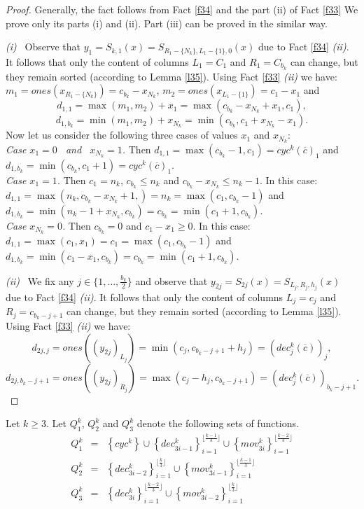 \documentclass{llncs}
\begin{document}
\begin{proof} Generally, the fact follows from Fact \ref{f34} and the
  part (ii) of Fact \ref{f33} We prove only its parts (i) and (ii). Part
  (iii) can be proved in the similar way.

\textit{(i)~} Observe that $y_1=S_{k,1}(x)=S_{R_1-\{N_k\},L_1-\{1\},0}(x)$
  due to Fact \ref{f34} \textit{(ii)}. It follows that only the content
  of columns $L_1=C_1$ and $R_1=C_{b_k}$ can change, but they remain
  sorted (according to Lemma \ref{l35}). Using Fact
  \ref{f33} \textit{(ii)} we have: $m_1 = ones(x_{R_1-\{N_k\}}) =
  c_{b_k}-x_{N_k}$, $m_2 = ones(x_{L_1-\{1\}}) = c_1-x_1$ and
$$d_{1,1} = \max(m_1,m_2)+x_1 = \max(c_{b_k}-x_{N_k}+x_1,c_1),$$
$$d_{1,b_k} = \min(m_1,m_2)+x_{N_k} = \min(c_{b_k},c_1+x_{N_k}-x_1).$$
Now let us consider the following three cases of values $x_1$ and
$x_{N_k}$: \\
\noindent
{\it Case $x_1=0$ ~and~ $x_{N_k}=1$.} Then 
  $d_{1,1} = \max(c_{b_k}-1,c_1) = cyc^k(\overline{c})_1$ and 
  $d_{1,b_k} = \min(c_{b_k},c_1+1)=cyc^k(\overline{c})_1$.\\
\noindent
{\it Case $x_1=1$.} Then $c_1=n_k$, $c_{b_k}\le n_k$ and
$c_{b_k}-x_{N_k}\le n_k-1$. In this case:
  $d_{1,1} = \max(n_k,c_{b_k}-x_{N_k}+1,) = n_k = \max(c_1,c_{b_k}-1)$ and 
  $d_{1,b_k} = \min(n_k-1+x_{N_k},c_{b_k}) = c_{b_k} = \min(c_1+1,c_{b_k})$.\\
\noindent
{\it Case $x_{N_k}=0$.} Then $c_{b_k}=0$ and $c_1-x_1\ge 0$. In this case:
  $d_{1,1} = \max(c_1,x_1) = c_1 = \max(c_1,c_{b_k}-1)$ and 
  $d_{1,b_k} = \min(c_1-x_1,c_{b_k}) = c_{b_k} = \min(c_1+1,c_{b_k})$.

\textit{(ii)~} We fix any $j\in\{1,\ldots,\frac{b_k}{2}\}$ and observe
  that $y_{2j}=S_{2j}(x)=S_{L_j,R_j,h_j}(x)$ due to Fact \ref{f34}
  \textit{(ii)}. It follows that only the content of columns $L_j=c_j$
  and $R_j=c_{b_k-j+1}$ can change, but they remain sorted (according to
  Lemma \ref{l35}). Using Fact \ref{f33} \textit{(ii)} we have:
$$d_{2j,j} = ones((y_{2j})_{L_j}) = \min(c_j,c_{b_k-j+1}+h_j) = 
  (dec^k_j(\overline{c}))_j,$$
$$d_{2j,b_k-j+1} = ones((y_{2j})_{R_j}) = \max(c_j-h_j,c_{b_k-j+1}) = 
  (dec^k_j(\overline{c}))_{b_k-j+1}.$$
\end{proof}
\begin{definition} \label{defQ}
Let $k\ge 3$. Let $Q^k_1$, $Q^k_2$ and $Q^k_3$ denote the following sets
of functions.
\begin{eqnarray}
Q^k_1 & = & \left\{cyc^k\right\} \cup 
          \left\{dec^k_{3i-1}\right\}_{i=1}^{\lfloor\frac{k-1}{3}\rfloor} \cup
          \left\{mov^k_{3i}\right\}_{i=1}^{\lfloor\frac{k-2}{3}\rfloor}\\
Q^k_2 & = & \left\{dec^k_{3i-2}\right\}_{i=1}^{\lfloor\frac{k}{3}\rfloor} \cup
          \left\{mov^k_{3i-1}\right\}_{i=1}^{\lfloor\frac{k-1}{3}\rfloor}\\
Q^k_3 & = & \left\{dec^k_{3i}\right\}_{i=1}^{\lfloor\frac{k-2}{3}\rfloor} \cup
          \left\{mov^k_{3i-2}\right\}_{i=1}^{\lfloor\frac{k}{3}\rfloor}
\end{eqnarray}\
\end{definition}
\end{document}

